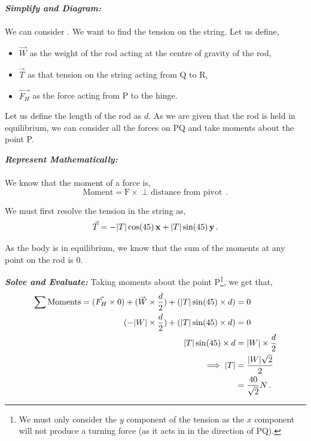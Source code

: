 \begin{subquestions}
\begin{subsubquestions}
\subsubquestion

\textbf{\textit{Simplify and Diagram:}} \\ \\
We can consider . We want to find the tension on the string. Let us define,
\begin{itemize}
	\item $\vec{W}$ as the weight of the rod acting at the centre of gravity of the rod,
	\item $\vec{T}$ as that tension on the string acting from Q to R,
	\item $\vec{F_H}$ as the force acting from P to the hinge.  
\end{itemize}
Let us define the length of the rod as $d$. As we are given that the rod is held in equilibrium, we can consider all the forces on PQ and take moments about the point P.




\textbf{\textit{Represent Mathematically:}} \\ \\
We know that the moment of a force is,
\begin{equation}
	\text{Moment} = \text{F} \times \text{$\perp$ distance from pivot} \,.
\end{equation}

We must first resolve the tension in the string as,
\begin{equation}
	\vec{T} = -|T|\cos(45)\,\mathbf{x} + |T|\sin(45)\,\mathbf{y} \,.
\end{equation}

As the body is in equilibrium, we know that the sum of the moments at any point on the rod is 0.




\textbf{\textit{Solve and Evaluate:}}
Taking moments about the point P\footnote{We must only consider the $y$ component of the tension as the $x$ component will not produce a turning force (as it acts in in the direction of PQ).}, we get that,
\begin{align}
	\sum \text{Moments} = (\vec{F_H}\times 0) + (\vec{W} \times \frac{d}{2}) + (|T|\sin(45) \times d) & = 0 \nonumber \\
	                                             (-|W| \times \frac{d}{2}) + (|T|\sin(45) \times d) & = 0 \nonumber \\
	                                                                |T|\sin(45) \times d & = |W| \times \frac{d}{2} \nonumber \\
	                                                                \implies |T| & = \frac{|W|\sqrt{2}}{2} \nonumber \\
	                                                                             & = \frac{40}{\sqrt{2}}N \,. 
\end{align}


\end{subsubquestions}
\end{subquestions}
